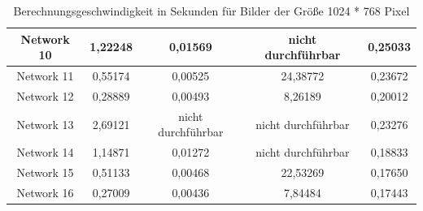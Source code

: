 \begin{table}[H]
\begin{tabular}{ |c|c|c|c|c| }
        Network 10 & 1,22248                                & 0,01569                                & \textcolor{danger}{nicht durchführbar} & 0,25033                                \\ \hline
        Network 11 & 0,55174                                & 0,00525                                & 24,38772                               & 0,23672                                \\ \hline
        Network 12 & 0,28889                                & 0,00493                                & 8,26189                                & 0,20012                                \\ \hline
        Network 13 & 2,69121                                & \textcolor{danger}{nicht durchführbar} & \textcolor{danger}{nicht durchführbar} & 0,23276                                \\ \hline
        Network 14 & 1,14871                                & 0,01272                                & \textcolor{danger}{nicht durchführbar} & 0,18833                                \\ \hline
        Network 15 & 0,51133                                & 0,00468                                & 22,53269                               & 0,17650                                \\ \hline
        Network 16 & 0,27009                                & 0,00436                                & 7,84484                                & 0,17443                                \\ \hline
    \end{tabular}
    \caption{Berechnungsgeschwindigkeit in Sekunden für Bilder der Größe 1024 * 768 Pixel}
    \label{tab:1024x768}
\end{table}

